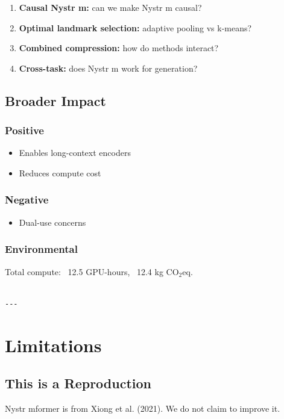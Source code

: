\begin{enumerate}
\item \textbf{Causal Nystr m:} can we make Nystr m causal?
\item \textbf{Optimal landmark selection:} adaptive pooling vs k-means?
\item \textbf{Combined compression:} how do methods interact?
\item \textbf{Cross-task:} does Nystr m work for generation?

\end{enumerate}
\subsection{Broader Impact}

\subsubsection{Positive}
\begin{itemize}
\item Enables long-context encoders
\item Reduces compute cost

\end{itemize}
\subsubsection{Negative}
\begin{itemize}
\item Dual-use concerns

\end{itemize}
\subsubsection{Environmental}
Total compute: ~12.5 GPU-hours, ~12.4 kg CO$_2$eq.
\begin{lstlisting}

---
\end{lstlisting}


\section{Limitations}

\subsection{This is a Reproduction}

Nystr mformer is from Xiong et al. (2021). We do not claim to improve it.

